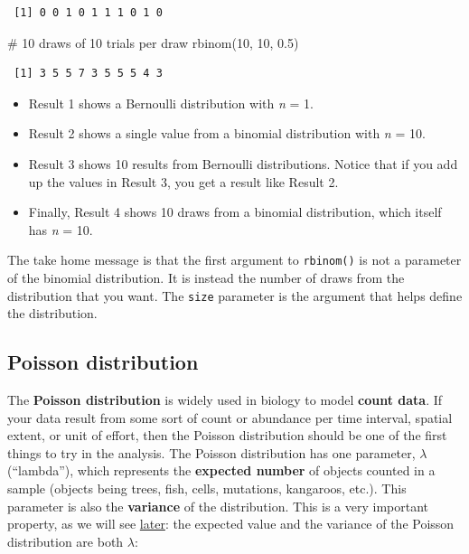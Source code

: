 \documentclass[
  13,
  letterpaper,
]{report}
\newenvironment{Shaded}{\begin{snugshade}}{\end{snugshade}}
\newcommand{\CommentTok}[1]{\textcolor[rgb]{0.37,0.37,0.37}{#1}}
\newcommand{\DecValTok}[1]{\textcolor[rgb]{0.68,0.00,0.00}{#1}}
\newcommand{\FloatTok}[1]{\textcolor[rgb]{0.68,0.00,0.00}{#1}}
\newcommand{\FunctionTok}[1]{\textcolor[rgb]{0.28,0.35,0.67}{#1}}
\newcommand{\NormalTok}[1]{\textcolor[rgb]{0.00,0.23,0.31}{#1}}
\providecommand{\tightlist}{%
  \setlength{\itemsep}{0pt}\setlength{\parskip}{0pt}}
\begin{document}
\begin{verbatim}
 [1] 0 0 1 0 1 1 1 0 1 0
\end{verbatim}

\begin{Shaded}
\begin{Highlighting}[]
\CommentTok{\# 10 draws of 10 trials per draw}
\FunctionTok{rbinom}\NormalTok{(}\DecValTok{10}\NormalTok{, }\DecValTok{10}\NormalTok{, }\FloatTok{0.5}\NormalTok{)}
\end{Highlighting}
\end{Shaded}

\begin{verbatim}
 [1] 3 5 5 7 3 5 5 5 4 3
\end{verbatim}

\begin{itemize}
\tightlist
\item
  Result 1 shows a Bernoulli distribution with \emph{n} = 1.
\item
  Result 2 shows a single value from a binomial distribution with
  \emph{n} = 10.
\item
  Result 3 shows 10 results from Bernoulli distributions. Notice that if
  you add up the values in Result 3, you get a result like Result 2.
\item
  Finally, Result 4 shows 10 draws from a binomial distribution, which
  itself has \emph{n} = 10.
\end{itemize}

The take home message is that the first argument to \texttt{rbinom()} is
not a parameter of the binomial distribution. It is instead the number
of draws from the distribution that you want. The \texttt{size}
parameter is the argument that helps define the distribution.

\subsection{Poisson distribution}\label{sec-dist-pois}

The \textbf{Poisson distribution} is widely used in biology to model
\textbf{count data}. If your data result from some sort of count or
abundance per time interval, spatial extent, or unit of effort, then the
Poisson distribution should be one of the first things to try in the
analysis. The Poisson distribution has one parameter, \(\lambda\)
(``lambda''), which represents the \textbf{expected number} of objects
counted in a sample (objects being trees, fish, cells, mutations,
kangaroos, etc.). This parameter is also the \textbf{variance} of the
distribution. This is a very important property, as we will see
\href{@sec-dist-negbin}{later}: the expected value and the variance of
the Poisson distribution are both \(\lambda\):
\end{document}
